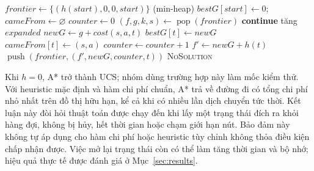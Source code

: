 \begin{algorithm}[H]
\caption{A* với cập nhật đường tốt hơn}
\label{alg:astar}
\begin{algorithmic}[1]
\State $\mathit{frontier}\gets\{(h(start),0,0,start)\}$ (min-heap)
\State $\mathit{bestG}[start]\gets0$; $\mathit{cameFrom}\gets\varnothing$
\State $\mathit{counter}\gets0$
    \State $(f,g,k,s)\gets\operatorname{pop}(\mathit{frontier})$
     \State \textbf{continue} \EndIf
     \State \Return {} \EndIf
    \State tăng $expanded$
        \State $\mathit{newG}\gets g+cost(s,a,t)$
            \State $\mathit{bestG}[t]\gets\mathit{newG}$
            \State $\mathit{cameFrom}[t]\gets(s,a)$
            \State $\mathit{counter}\gets\mathit{counter}+1$
            \State $f'\gets\mathit{newG}+h(t)$
            \State $\operatorname{push}(\mathit{frontier},(f',\mathit{newG},\mathit{counter},t))$
        \EndIf
    \EndFor
\EndWhile
\State \Return \textsc{NoSolution}
\EndFunction
\end{algorithmic}
\end{algorithm}

Khi $h=0$, A* trở thành UCS; nhóm dùng trường hợp này làm mốc kiểm thử. Với
heuristic mặc định và hàm chi phí chuẩn, A* trả về đường đi có tổng chi phí
nhỏ nhất trên đồ thị hữu hạn, kể cả khi có nhiều lần dịch chuyển tức thời. Kết
luận này đòi hỏi thuật toán được chạy đến khi lấy một trạng thái đích ra khỏi
hàng đợi, không bị hủy, hết thời gian hoặc chạm giới hạn nút. Bảo đảm này không
tự áp dụng cho hàm chi phí hoặc heuristic tùy chỉnh không thỏa điều kiện chấp
nhận được. Việc mở lại trạng thái còn có thể làm tăng thời gian và bộ nhớ; hiệu
quả thực tế được đánh giá ở Mục~\ref{sec:results}.

